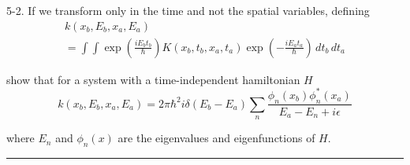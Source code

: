 \documentclass[12pt]{article}
\begin{document}
5-2. If we transform only in the time and not the spatial variables,
defining
\begin{multline*}
k(x_b,E_b,x_a,E_a)
\\
=\int\int
\exp\left(\frac{iE_bt_b}{\hbar}\right)
K(x_b,t_b,x_a,t_a)
\exp\left(-\frac{iE_at_a}{\hbar}\right)
\,dt_b\,dt_a
\tag{5.20}
\end{multline*}

show that for a system with a time-independent hamiltonian $H$
\begin{equation*}
k(x_b,E_b,x_a,E_a)=2\pi\hbar^2i\delta(E_b-E_a)\sum_n
\frac{\phi_n(x_b)\phi_n^*(x_a)}{E_a-E_n+i\epsilon}
\end{equation*}

where $E_n$ and $\phi_n(x)$ are the eigenvalues and eigenfunctions of $H$.

\bigskip
\hrule

\bigskip

\end{document}

